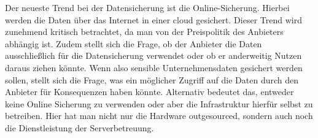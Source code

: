 Der neueste Trend bei der Datensicherung ist die Online-Sicherung. Hierbei
werden die Daten über das Internet in einer \gls{cloud} gesichert. Dieser
Trend wird zunehmend kritisch betrachtet, da man von der Preispolitik des
Anbieters abhängig ist. Zudem stellt sich die Frage, ob der Anbieter die
Daten ausschließlich für die Datensicherung verwendet oder ob er anderweitig
Nutzen daraus ziehen könnte. Wenn also sensible Unternehmensdaten gesichert
werden sollen, stellt sich die Frage, was ein möglicher Zugriff auf die Daten
durch den Anbieter für Konsequenzen haben könnte. Alternativ bedeutet das,
entweder keine Online Sicherung zu verwenden oder aber die Infrastruktur
hierfür selbst zu betreiben. Hier hat man nicht nur die Hardware outgesourced,
sondern auch noch die Dienstleistung der Serverbetreuung.
